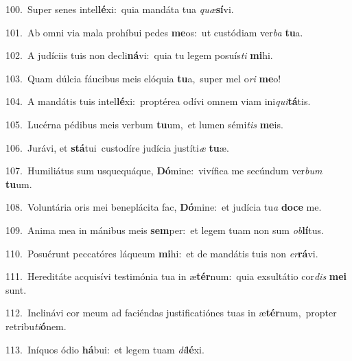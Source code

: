 {\numbfont\textcolor{\numbcolor}{100.}}~Super senes intel\-\textbf{lé}\-xi:~\star quia mandáta tua \textit{quæ}\-\textbf{sí}vi.\par
{\numbfont\textcolor{\numbcolor}{101.}}~Ab omni via mala prohíbui pedes \textbf{me}\-os:~\star ut custódiam ver\textit{ba} \textbf{tu}\-a.\par
{\numbfont\textcolor{\numbcolor}{102.}}~A judíciis tuis non decli\-\textbf{ná}\-vi:~\star quia tu legem posuís\textit{ti} \textbf{mi}\-hi.\par
{\numbfont\textcolor{\numbcolor}{103.}}~Quam dúlcia fáucibus meis elóquia \textbf{tu}\-a,~\star super mel o\textit{ri} \textbf{me}\-o!\par
{\numbfont\textcolor{\numbcolor}{104.}}~A mandátis tuis intel\-\textbf{lé}\-xi:~\star proptérea odívi omnem viam ini\-\textit{qui}\-\textbf{tá}tis.\par
{\numbfont\textcolor{\numbcolor}{105.}}~Lucérna pédibus meis verbum \textbf{tu}\-um,~\star et lumen sémi\textit{tis} \textbf{me}\-is.\par
{\numbfont\textcolor{\numbcolor}{106.}}~Jurávi, et \textbf{stá}\-tui~\star custodíre judícia justíti\textit{æ} \textbf{tu}\-æ.\par
{\numbfont\textcolor{\numbcolor}{107.}}~Humiliátus sum usquequáque, \textbf{Dó}\-mine:~\star vivífica me secúndum ver\textit{bum} \textbf{tu}\-um.\par
{\numbfont\textcolor{\numbcolor}{108.}}~Voluntária oris mei beneplácita fac, \textbf{Dó}\-mine:~\star et judícia tu\textit{a} \textbf{do}\-\textbf{ce} me.\par
{\numbfont\textcolor{\numbcolor}{109.}}~Anima mea in mánibus meis \textbf{sem}\-per:~\star et legem tuam non sum \textit{ob}\-\textbf{lí}tus.\par
{\numbfont\textcolor{\numbcolor}{110.}}~Posuérunt peccatóres láqueum \textbf{mi}\-hi:~\star et de mandátis tuis non \textit{er}\-\textbf{rá}vi.\par
{\numbfont\textcolor{\numbcolor}{111.}}~Hereditáte acquisívi testimónia tua in æ\-\textbf{tér}\-num:~\star quia exsultátio cor\textit{dis} \textbf{me}\-\textbf{i} sunt.\par
{\numbfont\textcolor{\numbcolor}{112.}}~Inclinávi cor meum ad faciéndas justificatiónes tuas in æ\-\textbf{tér}\-num,~\star propter retribu\-\textit{ti}\-\textbf{ó}nem.\par
{\numbfont\textcolor{\numbcolor}{113.}}~Iníquos ódio \textbf{há}\-bui:~\star et legem tuam \textit{di}\-\textbf{lé}xi.\par
